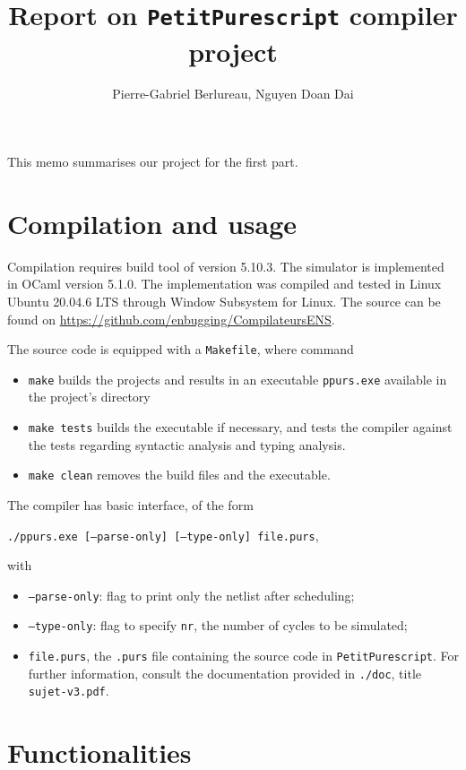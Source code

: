 \documentclass{amsart}
\title{Report on \texttt{PetitPurescript} compiler project}
\author{Pierre-Gabriel Berlureau, Nguyen Doan Dai}
\begin{document}
	\maketitle
	
	This memo summarises our project for the first part.
	
	\section{Compilation and usage}
	Compilation requires build tool  of version 5.10.3. The simulator is implemented in OCaml version 5.1.0. The implementation was compiled and tested in Linux Ubuntu 20.04.6 LTS through Window Subsystem for Linux. The source can be found on \url{https://github.com/enbugging/CompilateursENS}.
	
	The source code is equipped with a \texttt{Makefile}, where command
	\begin{itemize}
		\item \texttt{make} builds the projects and results in an executable \texttt{ppurs.exe} available in the project's directory
		\item \texttt{make tests} builds the executable if necessary, and tests the compiler against the tests regarding syntactic analysis and typing analysis.
		\item \texttt{make clean} removes the build files and the executable.
	\end{itemize}
	
	The compiler has basic interface, of the form 
	
	\texttt{./ppurs.exe [--parse-only] [--type-only] file.purs}, 
	
	with
	\begin{itemize}
		\item \texttt{--parse-only}: flag to print only the netlist after scheduling;
		\item \texttt{--type-only}: flag to specify \texttt{nr}, the number of cycles to be simulated;
		\item \texttt{file.purs}, the \texttt{.purs} file containing the source code in \texttt{PetitPurescript}. For further information, consult the documentation provided in \texttt{./doc}, title \texttt{sujet-v3.pdf}.
	\end{itemize}
	
	\section{Functionalities}
	
\end{document}
